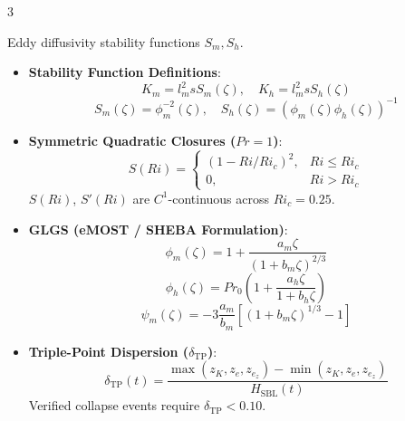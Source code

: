 \documentclass[9pt,landscape,letterpaper]{article}
\begin{document}
\begin{multicols}{3}
\begin{tcolorbox}[cheatsheetbox, title=5. Empirical Stability Closures]
Eddy diffusivity stability functions $S_m, S_h$.
\begin{itemize}
    \item \textbf{Stability Function Definitions}:
    $$K_m = l_m^2 s S_m(\zeta), \quad K_h = l_m^2 s S_h(\zeta)$$
    $$S_m(\zeta) = \phi_m^{-2}(\zeta), \quad S_h(\zeta) = (\phi_m(\zeta)\phi_h(\zeta))^{-1}$$
    \item \textbf{Symmetric Quadratic Closures ($Pr = 1$)}:
    $$S(Ri) = \begin{cases} (1 - Ri/Ri_c)^2, & Ri \le Ri_c \\ 0, & Ri > Ri_c \end{cases}$$
    $S(Ri)$, $S'(Ri)$ are $C^1$-continuous across $Ri_c = 0.25$.
    \item \textbf{GLGS (eMOST / SHEBA Formulation)}:
    $$\phi_m(\zeta) = 1 + \frac{a_m \zeta}{(1 + b_m \zeta)^{2/3}}$$
    $$\phi_h(\zeta) = Pr_0 \left( 1 + \frac{a_h \zeta}{1 + b_h \zeta} \right)$$
    $$\psi_m(\zeta) = -3 \frac{a_m}{b_m} \left[(1+b_m\zeta)^{1/3} - 1\right]$$
    \item \textbf{Triple-Point Dispersion ($\delta_{\text{TP}}$)}:
    $$\delta_{\text{TP}}(t) = \frac{\max(z_K, z_e, z_{e_z}) - \min(z_K, z_e, z_{e_z})}{H_{\text{SBL}}(t)}$$
    Verified collapse events require $\delta_{\text{TP}} < 0.10$.
\end{itemize}
\end{tcolorbox}

\columnbreak


\end{multicols}
\end{document}
